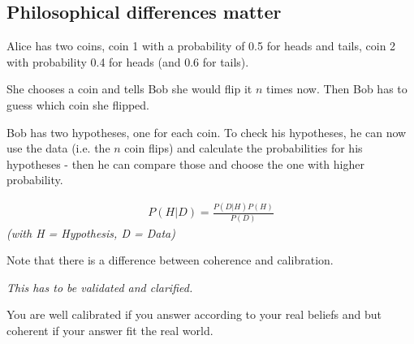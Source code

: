 \subsection*{Philosophical differences matter}
Alice has two coins, coin 1 with a probability of 0.5 for heads and tails, coin 2 with probability 0.4 for heads (and 0.6 for tails). 

She chooses a coin and tells Bob she would flip it $n$ times now. Then Bob has to guess which coin she flipped.

Bob has two hypotheses, one for each coin. To check his hypotheses, he can now use the data (i.e. the $n$ coin flips) and calculate the probabilities for his hypotheses - then he can compare those and choose the one with higher probability.

\begin{align*}
P(H|D) = \frac{P(D|H)P(H)}{P(D)}
\end{align*}
\textit{(with H = Hypothesis, D = Data)}

Note that there is a difference between coherence and calibration.

\textit{This has to be validated and clarified.}

You are well calibrated if you answer according to your real beliefs and but coherent if your answer fit the real world.

